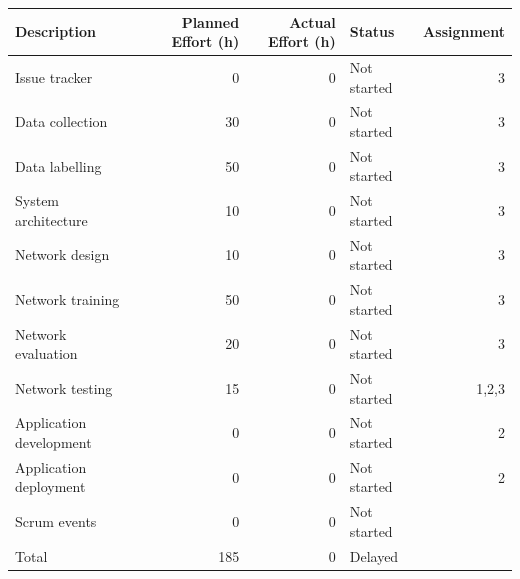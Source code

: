 \documentclass{article}
\begin{document}
\begin{center}
\begin{tabular}{lrrlr}
Description & Planned Effort (h) & Actual Effort (h) & Status & Assignment\\
\hline
Issue tracker & 0 & 0 & Not started & 3\\
Data collection & 30 & 0 & Not started & 3\\
Data labelling & 50 & 0 & Not started & 3\\
System architecture & 10 & 0 & Not started & 3\\
Network design & 10 & 0 & Not started & 3\\
Network training & 50 & 0 & Not started & 3\\
Network evaluation & 20 & 0 & Not started & 3\\
Network testing & 15 & 0 & Not started & 1,2,3\\
Application development & 0 & 0 & Not started & 2\\
Application deployment & 0 & 0 & Not started & 2\\
Scrum events & 0 & 0 & Not started & \\
\hline
Total & 185 & 0 & Delayed & \\
\end{tabular}
\end{center}
\end{document}
